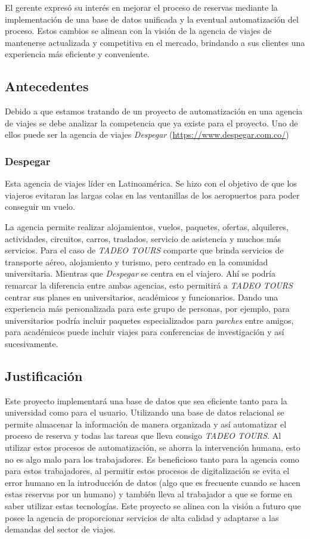 \documentclass{article}
\begin{document}
El gerente expresó su interés en mejorar el proceso de reservas mediante la implementación de una base de datos unificada y la eventual automatización del proceso. Estos cambios se alinean con la visión de la agencia de viajes de mantenerse actualizada y competitiva en el mercado, brindando a sus clientes una experiencia más eficiente y conveniente.

\subsection{Antecedentes}
Debido a que estamos tratando de un proyecto de automatización en una agencia de viajes se debe analizar la competencia que ya existe para el proyecto. Uno de ellos puede ser la agencia de viajes \textit{Despegar} (\url{https://www.despegar.com.co/})

\subsubsection{Despegar}
Esta agencia de viajes líder en Latinoamérica. Se hizo con el objetivo de que los viajeros evitaran las largas colas en las ventanillas de los aeropuertos para poder conseguir un vuelo. 

La agencia permite realizar alojamientos, vuelos, paquetes, ofertas, alquileres, actividades, circuitos, carros, traslados, servicio de asistencia y muchos más servicios. Para el caso de \textit{TADEO TOURS} comparte que brinda servicios de transporte aéreo, alojamiento y turismo, pero centrado en la comunidad universitaria. Mientras que \textit{Despegar} se centra en el viajero. Ahí se podría remarcar la diferencia entre ambas agencias, esto permitirá a \textit{TADEO TOURS} centrar sus planes en universitarios, académicos y funcionarios. Dando una experiencia más personalizada para este grupo de personas, por ejemplo, para universitarios podría incluir paquetes especializados para \textit{parches} entre amigos, para académicos puede incluir viajes para conferencias de investigación y así sucesivamente.

\subsection{Justificación}
Este proyecto implementará una base de datos que sea eficiente tanto para la universidad como para el usuario. Utilizando una base de datos relacional se permite almacenar la información de manera organizada y así automatizar el proceso de reserva y todas las tareas que lleva consigo \textit{TADEO TOURS}. Al utilizar estos procesos de automatización, se ahorra la intervención humana, esto no es algo malo para los trabajadores. Es beneficioso tanto para la agencia como para estos trabajadores, al permitir estos procesos de digitalización se evita el error humano en la introducción de datos (algo que es frecuente cuando se hacen estas reservas por un humano) y también lleva al trabajador a que se forme en saber utilizar estas tecnologías. Este proyecto se alinea con la visión a futuro que posee la agencia de proporcionar servicios de alta calidad y adaptarse a las demandas del sector de viajes. 
\end{document}

